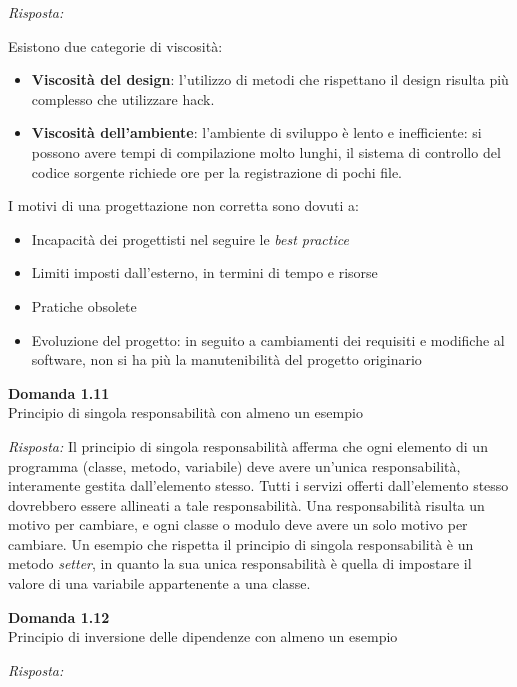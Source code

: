 \documentclass{article}
\newenvironment{problem}[2][Domanda]
    { \begin{mdframed}[backgroundcolor=gray!20] \textbf{#1 #2} \\}
    {  \end{mdframed}}
\newenvironment{solution}
    {\textit{Risposta:}}
    {}
\begin{document}
\begin{solution}
\begin{enumerate}
	\newline
	Esistono due categorie di viscosità:
	\begin{itemize}
		\item \textbf{Viscosità del design}: l'utilizzo di metodi che rispettano il design risulta più complesso che utilizzare hack.
		\item \textbf{Viscosità dell'ambiente}: l'ambiente di sviluppo è lento e inefficiente: si possono avere tempi di compilazione molto lunghi, il sistema di controllo del codice sorgente richiede ore per la registrazione di pochi file.
	\end{itemize}
\end{enumerate}
I motivi di una progettazione non corretta sono dovuti a:
\begin{itemize}
	\item Incapacità dei progettisti nel seguire le \textit{best practice}
	\item Limiti imposti dall'esterno, in termini di tempo e risorse
	\item Pratiche obsolete
	\item Evoluzione del progetto: in seguito a cambiamenti dei requisiti e modifiche al software, non si ha più la manutenibilità del progetto originario
\end{itemize}
\end{solution}


\begin{problem}{1.11}
Principio di singola responsabilità con almeno un esempio
\end{problem}
\begin{solution}
Il principio di singola responsabilità afferma che ogni elemento di un programma (classe, metodo, variabile) deve avere un'unica responsabilità, interamente gestita dall'elemento stesso.
Tutti i servizi offerti dall'elemento stesso dovrebbero essere allineati a tale responsabilità.
\newline
Una responsabilità risulta un motivo per cambiare, e ogni classe o modulo deve avere un solo motivo per cambiare.
\newline
Un esempio che rispetta il principio di singola responsabilità è un metodo \textit{setter}, in quanto la sua unica responsabilità è quella di impostare il valore di una variabile appartenente a una classe.
\end{solution}


\begin{problem}{1.12}
Principio di inversione delle dipendenze con almeno un esempio
\end{problem}
\begin{solution}
\end{solution}
\end{document}
